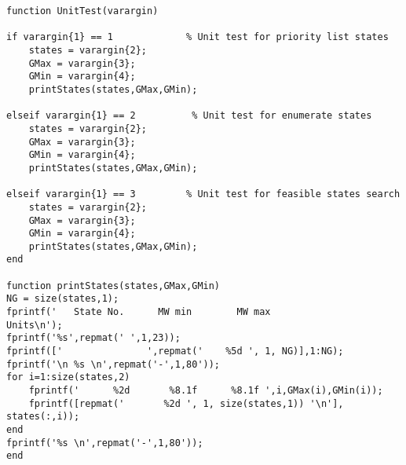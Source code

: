 \begin{verbatim}
function UnitTest(varargin)

if varargin{1} == 1             % Unit test for priority list states
    states = varargin{2};
    GMax = varargin{3};
    GMin = varargin{4};
    printStates(states,GMax,GMin);

elseif varargin{1} == 2          % Unit test for enumerate states
    states = varargin{2};
    GMax = varargin{3};
    GMin = varargin{4};
    printStates(states,GMax,GMin);

elseif varargin{1} == 3         % Unit test for feasible states search
    states = varargin{2};
    GMax = varargin{3};
    GMin = varargin{4};
    printStates(states,GMax,GMin);
end

function printStates(states,GMax,GMin)
NG = size(states,1);
fprintf('   State No.      MW min        MW max                     Units\n');
fprintf('%s',repmat(' ',1,23));
fprintf(['               ',repmat('    %5d ', 1, NG)],1:NG);
fprintf('\n %s \n',repmat('-',1,80'));
for i=1:size(states,2)
    fprintf('      %2d       %8.1f      %8.1f ',i,GMax(i),GMin(i));
    fprintf([repmat('       %2d ', 1, size(states,1)) '\n'], states(:,i));
end
fprintf('%s \n',repmat('-',1,80'));
end
\end{verbatim}

